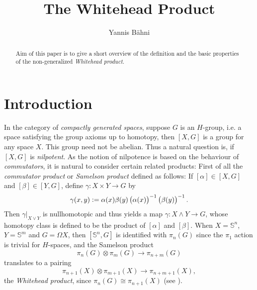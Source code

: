

\title{The Whitehead Product}
\author{Yannis B\"{a}hni}
\address[Yannis B\"{a}hni]{University of Zurich, R\"{a}mistrasse 71, 8006 Zurich}



\begin{abstract}
	Aim of this paper is to give a short overview of the definition and the basic properties of the non-generalized \emph{Whitehead product}.
\end{abstract}

\maketitle

\tableofcontents

\section{Introduction}
In the category of \emph{compactly generated spaces}, suppose $G$ is an $H$-group, i.e. a space satisfying the group axioms up to homotopy, then $[X,G]$ is a group for any space $X$. This group need not be abelian. Thus a natural question is, if $[X,G]$ is \emph{nilpotent}. As the notion of nilpotence is based on the behaviour of \emph{commutators}, it is natural to consider certain related products: First of all the \emph{commutator product} or \emph{Samelson product} defined as follows: If $[\alpha] \in [X,G]$ and $[\beta] \in [Y,G]$, define $\gamma : X \times Y \to G$ by
\begin{equation*}
	\gamma(x,y) := \alpha(x)\beta(y)\del[1]{\alpha(x)}^{-1}\del[1]{\beta(y)}^{-1}.
\end{equation*}
Then $\gamma\vert_{X \vee Y}$ is nullhomotopic and thus yields a map $\gamma : X \wedge Y \to G$, whose homotopy class is defined to be the product of $[\alpha]$ and $[\beta]$. When $X = \mathbb{S}^n$, $Y = \mathbb{S}^m$ and $G = \Omega X$, then $[\mathbb{S}^n,G]$ is identified with $\pi_n(G)$ since the $\pi_1$ action is trivial for $H$-spaces, and the Samelson product
\begin{equation*}
	\pi_n(G) \otimes \pi_m(G) \to \pi_{n + m}(G)
\end{equation*}
\noindent translates to a pairing
\begin{equation*}
	\pi_{n + 1}(X) \otimes \pi_{m + 1}(X) \to \pi_{n + m + 1}(X),
\end{equation*}
\noindent the \emph{Whitehead product}, since $\pi_n(G) \cong \pi_{n + 1}(X)$ (see \cite[456--457]{whitehead:homotopy_theory:1978}).

